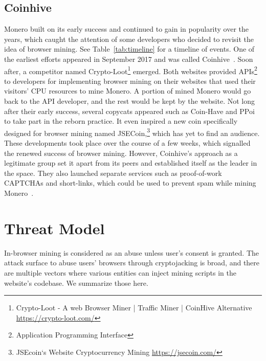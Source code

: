 \subsection{Coinhive}



Monero built on its early success and continued to gain in popularity over the years, which caught the attention of some developers who decided to revisit the idea of browser mining. See Table~\ref{tab:timeline} for a timeline of events.  One of the earliest efforts appeared in September 2017 and was called Coinhive~\cite{coinhive}. Soon after, a competitor named Crypto-Loot\footnote{Crypto-Loot - A web Browser Miner | Traffic Miner | CoinHive Alternative \url{https://crypto-loot.com/}} emerged. Both websites provided APIs\footnote{Application Programming Interface} to developers for implementing browser mining on their websites that used their visitors' CPU resources to mine Monero. A portion of mined Monero would go back to the API developer, and the rest would be kept by the website. Not long after their early success, several copycats appeared such as Coin-Have and PPoi~\cite{coinhivecopycats} to take part in the reborn practice. It even inspired a new coin specifically designed for browser mining named JSECoin,\footnote{JSEcoin`s Website Cryptocurrency Mining \url{https://jsecoin.com/}} which has yet to find an audience. These developments took place over the course of a few weeks, which signalled the renewed success of browser mining. However, Coinhive's approach as a legitimate group set it apart from its peers and established itself as the leader in the space. They also launched separate services such as proof-of-work CAPTCHAs and short-links, which could be used to prevent spam while mining Monero~\cite{coinhive}.

%
%
%
%
%
%






%
%
%
%
%
%

\section{Threat Model}
In-browser mining is considered as an abuse unless user's consent is granted. The attack surface to abuse users' browsers through cryptojacking is broad, and there are multiple vectors where various entities can inject mining scripts in the website's codebase. We summarize those here. 

